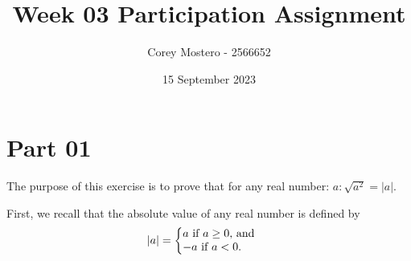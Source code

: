\documentclass{article}
\title{Week 03 Participation Assignment}
\author{Corey Mostero - 2566652}
\date{15 September 2023}
\begin{document}
\newcommand{\hr}{\par\noindent\rule{\textwidth}{0.4pt}}

\newcommand{\bc}[1]{
	\begin{equation*}
		\begin{boxed}
			{#1}
		\end{boxed}
	\end{equation*}
}

\newcommand{\cond}[2]{
	\ifmmode
		{#1} \quad {#2}
	\else
		$$ {#1} \quad {#2} $$
	\fi
}

\newcommand{\matr}[1]{
	\ifmmode \bm{#1}
	\else \textit{\textbf{#1}}
	\fi
}
\newcommand{\vect}[1]{
	\ifmmode \mathbf{#1}
	\else \textbf{#1}
	\fi
}


\maketitle
\newpage

\tableofcontents

\section{Part 01}

The purpose of this exercise is to prove that for any real number: $ a: \sqrt{ a^2 } = \left| a \right| $.

First, we recall that the absolute value of any real number is defined by
\begin{align*}
	|a| & =
	\left\{
		\begin{array}{@{}l@{}}
			a \text{ if $ a \geq 0 $, and } \\
			-a \text{ if $ a < 0 $. }
		\end{array}
	\right.
\end{align*}
\end{document}
